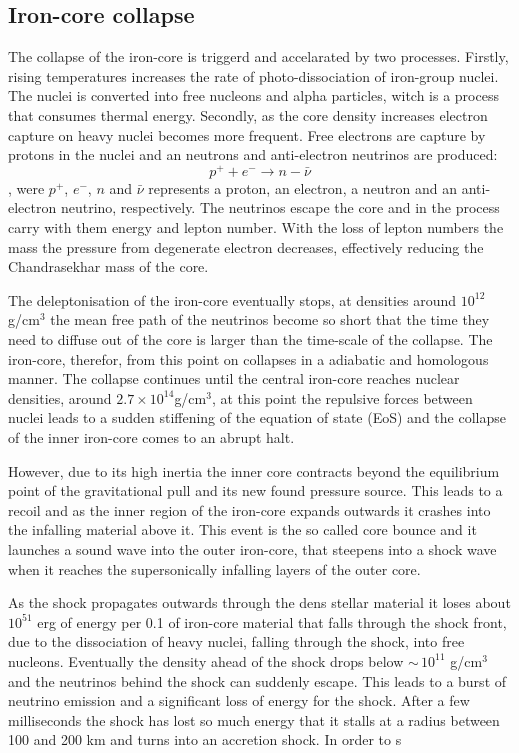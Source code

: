 \subsection{Iron-core collapse}
The collapse of the iron-core is triggerd and accelarated by two processes.
Firstly, rising temperatures increases the rate of photo-dissociation of iron-group 
nuclei. The nuclei is converted into free nucleons and alpha particles,
witch is a process that consumes thermal energy. Secondly, as the core density increases electron capture
on heavy nuclei becomes more frequent. Free electrons are capture by protons in the nuclei and an neutrons 
and anti-electron neutrinos are produced:
\begin{equation} \label{eqSN:ecapture}
p^{+} + e^{-} \rightarrow n - \bar{\nu}
\end{equation},
were $p^{+}$, $e^{-}$, $n$ and $\bar{\nu}$ represents a proton, an electron, 
a neutron and an anti-electron neutrino, respectively.
The neutrinos escape the core and in the process carry with them energy
and lepton number. With the loss of lepton numbers the mass the pressure from
degenerate electron decreases, effectively reducing the Chandrasekhar mass of the core. 

The deleptonisation of the iron-core eventually stops, at densities around $10^{12}$ g/cm$^3$ the
mean free path of the neutrinos become so short that the time they need to diffuse out of the
core is larger than the time-scale of the collapse. The iron-core, therefor, from this point on collapses in a 
adiabatic and homologous manner. The collapse continues until the central iron-core reaches nuclear densities, around $2.7 \times 10^{14} $g/cm$^3$,
at this point the repulsive forces between nuclei leads to a sudden stiffening of the equation of state (EoS) and the collapse of the
inner iron-core comes to an abrupt halt. 

However, due to its high inertia the inner core contracts beyond the equilibrium point of the
gravitational pull and its new found pressure source. This leads to a recoil and as the inner region of the iron-core expands outwards it crashes
into the infalling material above it. This event is the so called core bounce and it launches a sound wave into the outer iron-core, that 
steepens into a shock wave when it reaches the supersonically infalling layers of the outer core.

As the shock propagates outwards through the dens stellar material it loses about 
$10^{51}$ erg of energy per 0.1 \msun of iron-core material that falls through the shock front, 
due to the dissociation of heavy nuclei, falling through the shock, into free nucleons.
Eventually the density ahead of the shock drops below $\sim \, 10^{11}$ g/cm$^3$ and
the neutrinos behind the shock can suddenly escape. This leads to a burst of neutrino 
emission and a significant loss of energy for the shock. After a few milliseconds the
shock has lost so much energy that it stalls at a radius between 100 and 200 km
and turns into an accretion shock. In order to s



